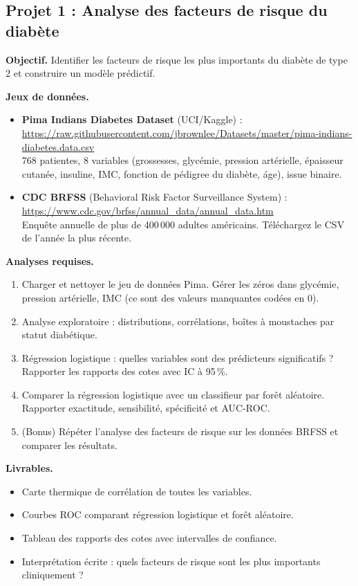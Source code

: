 \subsection{Projet 1 : Analyse des facteurs de risque du diab\`ete}

\textbf{Objectif.} Identifier les facteurs de risque les plus importants du diab\`ete de type 2 et construire un mod\`ele pr\'edictif.

\textbf{Jeux de donn\'ees.}
\begin{itemize}
  \item \textbf{Pima Indians Diabetes Dataset} (UCI/Kaggle) :\\
  \url{https://raw.githubusercontent.com/jbrownlee/Datasets/master/pima-indians-diabetes.data.csv}\\
  768 patientes, 8 variables (grossesses, glyc\'emie, pression art\'erielle, \'epaisseur cutan\'ee, insuline, IMC, fonction de p\'edigree du diab\`ete, \'age), issue binaire.
  \item \textbf{CDC BRFSS} (Behavioral Risk Factor Surveillance System) :\\
  \url{https://www.cdc.gov/brfss/annual_data/annual_data.htm}\\
  Enqu\^ete annuelle de plus de 400\,000 adultes am\'ericains. T\'el\'echargez le CSV de l'ann\'ee la plus r\'ecente.
\end{itemize}

\textbf{Analyses requises.}
\begin{enumerate}
  \item Charger et nettoyer le jeu de donn\'ees Pima. G\'erer les z\'eros dans glyc\'emie, pression art\'erielle, IMC (ce sont des valeurs manquantes cod\'ees en 0).
  \item Analyse exploratoire : distributions, corr\'elations, bo\^ites \`a moustaches par statut diab\'etique.
  \item R\'egression logistique : quelles variables sont des pr\'edicteurs significatifs ? Rapporter les rapports des cotes avec IC \`a 95\,\%.
  \item Comparer la r\'egression logistique avec un classifieur par for\^et al\'eatoire. Rapporter exactitude, sensibilit\'e, sp\'ecificit\'e et AUC-ROC.
  \item (Bonus) R\'ep\'eter l'analyse des facteurs de risque sur les donn\'ees BRFSS et comparer les r\'esultats.
\end{enumerate}

\textbf{Livrables.}
\begin{itemize}
  \item Carte thermique de corr\'elation de toutes les variables.
  \item Courbes ROC comparant r\'egression logistique et for\^et al\'eatoire.
  \item Tableau des rapports des cotes avec intervalles de confiance.
  \item Interpr\'etation \'ecrite : quels facteurs de risque sont les plus importants cliniquement ?
\end{itemize}

